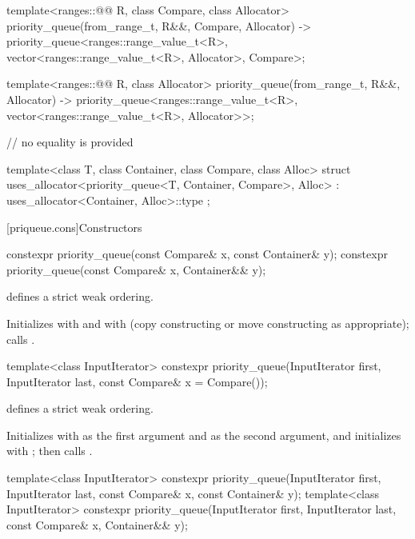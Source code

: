 \begin{codeblock}
{  template<ranges::@@ R, class Compare, class Allocator>
    priority_queue(from_range_t, R&&, Compare, Allocator)
      -> priority_queue<ranges::range_value_t<R>, vector<ranges::range_value_t<R>, Allocator>,
                        Compare>;

  template<ranges::@@ R, class Allocator>
    priority_queue(from_range_t, R&&, Allocator)
      -> priority_queue<ranges::range_value_t<R>, vector<ranges::range_value_t<R>, Allocator>>;

  // no equality is provided

  template<class T, class Container, class Compare, class Alloc>
    struct uses_allocator<priority_queue<T, Container, Compare>, Alloc>
      : uses_allocator<Container, Alloc>::type { };
}
\end{codeblock}

[priqueue.cons]{Constructors}

%
\begin{itemdecl}
constexpr priority_queue(const Compare& x, const Container& y);
constexpr priority_queue(const Compare& x, Container&& y);
\end{itemdecl}

\begin{itemdescr}
\pnum
\expects
{} defines a strict weak ordering.

\pnum
\effects
Initializes
 with
 and
 with
 (copy constructing or move constructing as appropriate);
calls
.
\end{itemdescr}

%
\begin{itemdecl}
template<class InputIterator>
  constexpr priority_queue(InputIterator first, InputIterator last, const Compare& x = Compare());
\end{itemdecl}

\begin{itemdescr}
\pnum
\expects
{} defines a strict weak ordering.

\pnum
\effects
Initializes  with
 as the first argument and
 as the second argument, and
initializes  with ;
then calls .
\end{itemdescr}

%
\begin{itemdecl}
template<class InputIterator>
  constexpr priority_queue(InputIterator first, InputIterator last, const Compare& x,
                           const Container& y);
template<class InputIterator>
  constexpr priority_queue(InputIterator first, InputIterator last, const Compare& x,
                           Container&& y);
\end{itemdecl}

